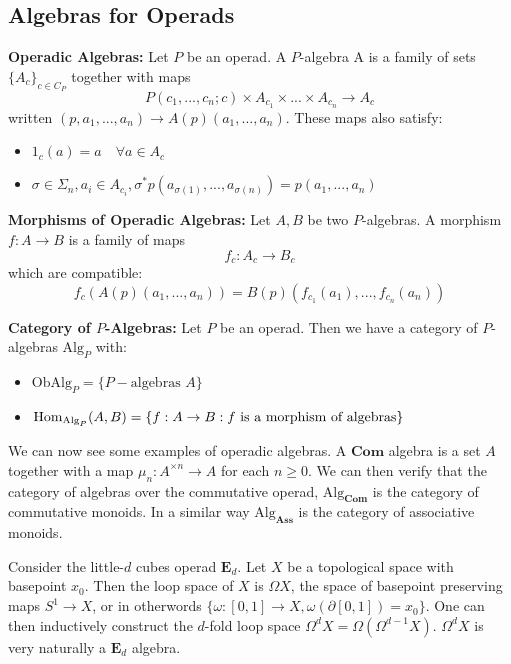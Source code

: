 \subsection{Algebras for Operads}
\begin{definition}
    \textbf{Operadic Algebras: }Let $P$ be an operad. A $P$-algebra A is a family of sets $\{A_c\}_{c\in C_P}$ together with maps
    \[P(c_1,...,c_n; c)\times A_{c_1}\times...\times A_{c_n}\to A_c\]
    written $(p, a_1,..., a_n)\to A(p)(a_1,...,a_n)$. These maps also satisfy:
    \begin{itemize}
        \item $1_c(a) = a \quad \forall a \in A_c$
        \item $\sigma \in \Sigma_n, a_i\in A_{c_i}, \sigma^*p(a_{\sigma(1)},...,a_{\sigma(n)}) = p(a_1,...,a_n)$
    \end{itemize} 
\end{definition}

\begin{definition}
    \textbf{Morphisms of Operadic Algebras: }Let $A,B$ be two $P$-algebras. A morphism $f:A\to B$ is a family of maps
    \[f_c:A_c\to B_c\]
    which are compatible:
    \[f_c(A(p)(a_1,...,a_n)) = B(p)(f_{c_1}(a_1),...,f_{c_n}(a_n))\]
\end{definition}

\begin{definition}
    \textbf{Category of $P$-Algebras: }Let $P$ be an operad. Then we have a category of $P$-algebras $\text{Alg}_P$ with:
    \begin{itemize}
        \item $\text{Ob}\text{Alg}_P = \{P- \text{algebras } A\}$
        \item $\text{Hom}_{\text{Alg}_P}(A,B) = \{f:A\to B: f \text{ is a morphism of algebras}\}$
    \end{itemize}
\end{definition}

We can now see some examples of operadic algebras. A $\mathbf{Com}$ algebra is a set $A$ together with a map $\mu_n: A^{\times n}\to A$ for each $n\geq 0$. We can then verify that the category of algebras over the commutative operad, $\text{Alg}_{\mathbf{Com}}$ is the category of commutative monoids. In a similar way $\text{Alg}_{\mathbf{Ass}}$ is the category of associative monoids. 

Consider the little-$d$ cubes operad $\mathbf{E}_d$. Let $X$ be a topological space with basepoint $x_0$. Then the loop space of $X$ is $\Omega X$, the space of basepoint preserving maps $S^1\to X$, or in otherwords $\{\omega :[0,1]\to X, \omega(\partial [0,1]) = x_0\}$. One can then inductively construct the $d$-fold loop space $\Omega^d X = \Omega(\Omega^{d-1} X)$. $\Omega^d X$ is very naturally a $\mathbf{E}_d$ algebra. 
